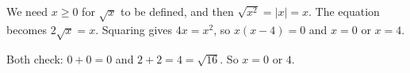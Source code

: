 We need $x\ge0$ for $\sqrt x$ to be defined, and then $\sqrt{x^2}=|x|=x$. The equation becomes $2\sqrt x=x$. Squaring gives $4x=x^2$, so $x(x-4)=0$ and $x=0$ or $x=4$.

Both check: $0+0=0$ and $2+2=4=\sqrt{16}$. So $x=\boxed{0\text{ or }4}$.
